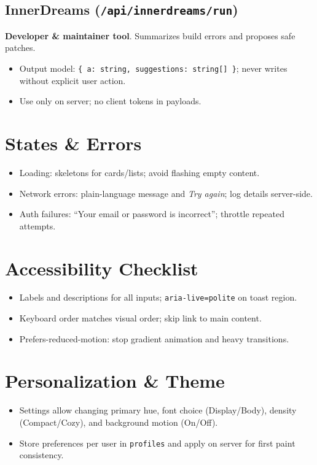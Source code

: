 \documentclass[11pt]{article}
\begin{document}
\subsection{InnerDreams (\texttt{/api/innerdreams/run})}
\textbf{Developer \& maintainer tool}. Summarizes build errors and proposes safe patches.
\begin{itemize}
  \item Output model: \texttt{\{ a: string, suggestions: string[] \}}; never writes without explicit user action.
  \item Use only on server; no client tokens in payloads.
\end{itemize}

\section{States \& Errors}
\begin{itemize}
  \item Loading: skeletons for cards/lists; avoid flashing empty content.
  \item Network errors: plain-language message and \emph{Try again}; log details server-side.
  \item Auth failures: ``Your email or password is incorrect''; throttle repeated attempts.
\end{itemize}

\section{Accessibility Checklist}
\begin{itemize}
  \item Labels and descriptions for all inputs; \texttt{aria-live=polite} on toast region.
  \item Keyboard order matches visual order; skip link to main content.
  \item Prefers-reduced-motion: stop gradient animation and heavy transitions.
\end{itemize}

\section{Personalization \& Theme}
\begin{itemize}
  \item Settings allow changing primary hue, font choice (Display/Body), density (Compact/Cozy), and background motion (On/Off).
  \item Store preferences per user in \texttt{profiles} and apply on server for first paint consistency.
\end{itemize}
\end{document}
